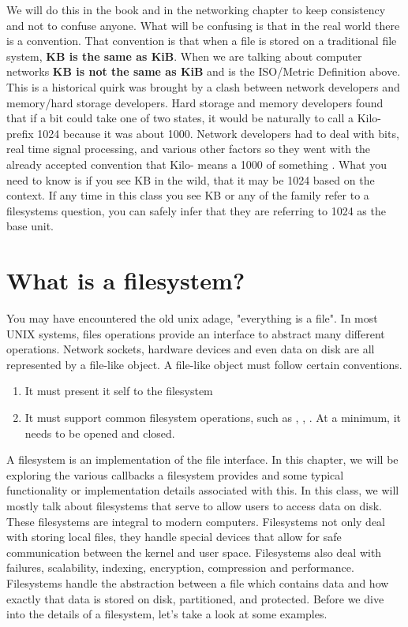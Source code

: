 We will do this in the book and in the networking chapter to keep consistency and not to confuse anyone.
What will be confusing is that in the real world there is a convention.
That convention is that when a file is stored on a traditional file system, \textbf{KB is the same as KiB}.
When we are talking about computer networks \textbf{KB is not the same as KiB} and is the ISO/Metric Definition above.
This is a historical quirk was brought by a clash between network developers and memory/hard storage developers.
Hard storage and memory developers found that if a bit could take one of two states, it would be naturally to call a Kilo- prefix 1024 because it was about 1000.
Network developers had to deal with bits, real time signal processing, and various other factors so they went with the already accepted convention that Kilo- means a 1000 of something .
What you need to know is if you see KB in the wild, that it may be 1024 based on the context.
If any time in this class you see KB or any of the family refer to a filesystems question, you can safely infer that they are referring to 1024 as the base unit.

\section{What is a filesystem?}

You may have encountered the old unix adage, "everything is a file".
In most UNIX systems, files operations provide an interface to abstract many different operations.
Network sockets, hardware devices and even data on disk are all represented by a file-like object.
A file-like object must follow certain conventions.

\begin{enumerate}
  \item It must present it self to the filesystem
  \item It must support common filesystem operations, such as , , . At a minimum, it needs to be opened and closed.
\end{enumerate}

A filesystem is an implementation of the file interface.
In this chapter, we will be exploring the various callbacks a filesystem provides and some typical functionality or implementation details associated with this.
In this class, we will mostly talk about filesystems that serve to allow users to access data on disk.
These filesystems are integral to modern computers.
Filesystems not only deal with storing local files, they handle special devices that allow for safe communication between the kernel and user space.
Filesystems also deal with failures, scalability, indexing, encryption, compression and performance.
Filesystems handle the abstraction between a file which contains data and how exactly that data is stored on disk, partitioned, and protected.
Before we dive into the details of a filesystem, let's take a look at some examples.

